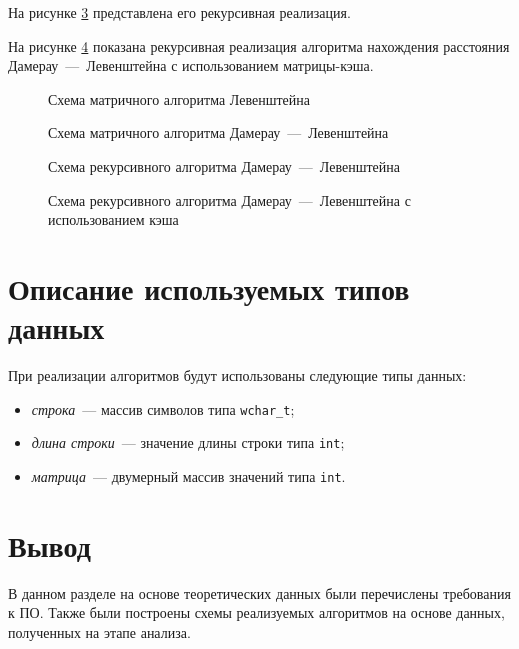 На рисунке \ref{fig:dam-lev-rec} представлена его рекурсивная реализация.

На рисунке \ref{fig:dam-lev-rec-cache} показана рекурсивная реализация алгоритма нахождения расстояния Дамерау~---~Левенштейна с использованием матрицы-кэша.

\begin{figure}[H]
    \centering
    
    \caption{Схема матричного алгоритма Левенштейна}
    \label{fig:lev-iter}
\end{figure}

\begin{figure}[H]
    \centering
    
    \caption{Схема матричного алгоритма Дамерау~---~Левенштейна}
    \label{fig:dam-lev-iter}
\end{figure}

\begin{figure}[H]
    \centering
    
    \caption{Схема рекурсивного алгоритма Дамерау~---~Левенштейна}
    \label{fig:dam-lev-rec}
\end{figure}

\begin{figure}[H]
    \centering
    
    \caption{Схема рекурсивного алгоритма Дамерау~---~Левенштейна с использованием кэша}
    \label{fig:dam-lev-rec-cache}
\end{figure}


\section{Описание используемых типов данных}

При реализации алгоритмов будут использованы следующие типы данных:

\begin{itemize}
    \item \textit{строка}~--- массив символов типа \texttt{wchar\_t};
    \item \textit{длина строки}~--- значение длины строки типа \texttt{int};
    \item \textit{матрица}~--- двумерный массив значений типа \texttt{int}.
\end{itemize}

\section*{Вывод}

В данном разделе на основе теоретических данных были перечислены требования к ПО.
Также были построены схемы реализуемых алгоритмов на основе данных, полученных на этапе анализа.